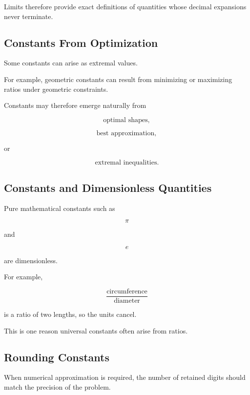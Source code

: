 Limits therefore provide exact definitions of quantities whose decimal
expansions never terminate.

\subsection{Constants From Optimization}
\label{subsec:constants-from-optimization}

Some constants can arise as extremal values.

For example, geometric constants can result from minimizing or maximizing
ratios under geometric constraints.

Constants may therefore emerge naturally from

\[
\boxed{
\text{optimal shapes},
}
\]

\[
\boxed{
\text{best approximation},
}
\]

or

\[
\boxed{
\text{extremal inequalities}.
}
\]

\subsection{Constants and Dimensionless Quantities}
\label{subsec:constants-dimensionless}

Pure mathematical constants such as

\[
\pi
\]

and

\[
e
\]

are dimensionless.

For example,

\[
\frac{
\text{circumference}
}{
\text{diameter}
}
\]

is a ratio of two lengths, so the units cancel.

This is one reason universal constants often arise from ratios.

\subsection{Rounding Constants}
\label{subsec:rounding-constants}

When numerical approximation is required, the number of retained digits
should match the precision of the problem.

